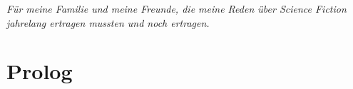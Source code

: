 \documentclass[10pt,oneside]{book}
\newcommand{\ortswechsel}{\vspace{1cm}\\}
\begin{document}
\newpage
\thispagestyle{empty}
\vspace*{2cm}
\large{\textit{Für meine Familie und meine Freunde, die meine Reden über Science Fiction jahrelang ertragen mussten und noch ertragen.}}
%
%
\newpage
\setcounter{page}{1} %
%
\chapter{Prolog}

\chapter{}

\ortswechsel

\ortswechsel

\ortswechsel

\chapter{}

\ortswechsel

\ortswechsel

\chapter{}

\ortswechsel

\ortswechsel

\chapter{}

\ortswechsel

\ortswechsel

\ortswechsel

\ortswechsel

\ortswechsel

\ortswechsel

\end{document}
